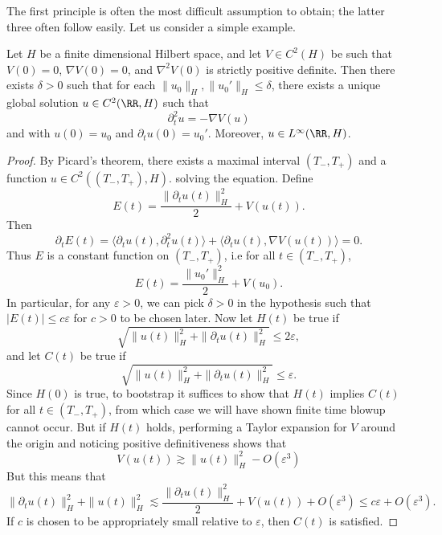 The first principle is often the most difficult assumption to obtain; the latter three often follow easily. Let us consider a simple example.

\begin{theorem}
    Let $H$ be a finite dimensional Hilbert space, and let $V \in C^2(H)$ be such that $V(0) = 0$, $\nabla V(0) = 0$, and $\nabla^2 V(0)$ is strictly positive definite. Then there exists $\delta > 0$ such that for each $\| u_0 \|_H, \| u_0' \|_H \leq \delta$, there exists a unique global solution $u \in C^2(\RR,H)$ such that
    \[ \partial_t^2 u = - \nabla V(u) \]
    and with $u(0) = u_0$ and $\partial_t u(0) = u_0'$. Moreover, $u \in L^\infty(\RR,H)$.
\end{theorem}
\begin{proof}
    By Picard's theorem, there exists a maximal interval $(T_-, T_+)$ and a function $u \in C^2((T_-,T_+),H)$. solving the equation. Define
    \[ E(t) = \frac{\| \partial_t u(t) \|_H^2}{2} + V(u(t)). \]
    Then
    \[ \partial_t E(t) = \langle \partial_t u(t), \partial_t^2 u(t) \rangle + \langle \partial_t u(t), \nabla V(u(t)) \rangle = 0. \]
    Thus $E$ is a constant function on $(T_-,T_+)$, i.e for all $t \in (T_-,T_+)$,
    \[ E(t) = \frac{\| u_0' \|_H^2}{2} + V(u_0). \]
    In particular, for any $\varepsilon > 0$, we can pick $\delta > 0$ in the hypothesis such that $|E(t)| \leq c \varepsilon$ for $c > 0$ to be chosen later. Now let $H(t)$ be true if
    \[ \sqrt{\| u(t) \|_H^2 + \| \partial_t u(t) \|_H^2} \leq 2 \varepsilon, \]
    and let $C(t)$ be true if
    \[ \sqrt{\| u(t) \|_H^2 + \| \partial_t u(t) \|_H^2} \leq \varepsilon. \]
    Since $H(0)$ is true, to bootstrap it suffices to show that $H(t)$ implies $C(t)$ for all $t \in (T_-,T_+)$, from which case we will have shown finite time blowup cannot occur. But if $H(t)$ holds, performing a Taylor expansion for $V$ around the origin and noticing positive definitiveness shows that
    \[ V(u(t)) \gtrsim \| u(t) \|_H^2 - O(\varepsilon^3) \]
    But this means that
    \[ \| \partial_t u(t) \|_H^2 + \| u(t) \|_H^2 \lesssim \frac{\| \partial_t u(t) \|_H^2}{2} + V(u(t)) + O(\varepsilon^3) \leq c \varepsilon + O(\varepsilon^3). \]
    If $c$ is chosen to be appropriately small relative to $\varepsilon$, then $C(t)$ is satisfied.
\end{proof}






























